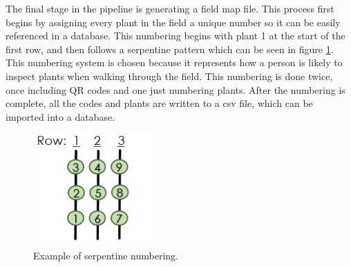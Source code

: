 The final stage in the pipeline is generating a field map file.  This process first begins by assigning every plant in the field a unique number so it can be easily referenced in a database.  This numbering begins with plant 1 at the start of the first row, and then follows a serpentine pattern which can be seen in figure \ref{figure:serpentine}. This numbering system is chosen because it represents how a person is likely to inspect plants when walking through the field.  This numbering is done twice, once including QR codes and one just numbering plants.  After the numbering is complete, all the codes and plants are written to a \ac{csv} file, which can be imported into a database.

\begin{figure}[hb]
	\centering
    \includegraphics[height=1.7in]{figures/sepentine.png}
    \caption[Serpentine numbering]{Example of serpentine numbering.}
    \label{figure:serpentine}
\end{figure}


